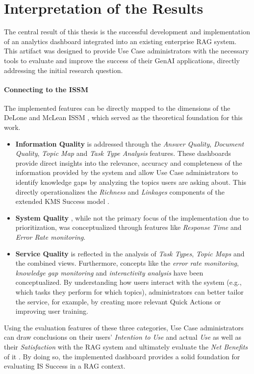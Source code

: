 \documentclass[
	english,
	ruledheaders=section,%
	class=report,%
	thesis={type=bachelor},%
	accentcolor=1b,%
	custommargins=true,%
	marginpar=false,%
	parskip=half-,%
	fontsize=11pt,%
	DIV=14,
]{tudapub}
\begin{document}
\section{Interpretation of the Results}
The central result of this thesis is the successful development and implementation of an analytics dashboard integrated into an existing enterprise RAG system. This artifact was designed to provide Use Case administrators with the necessary tools to evaluate and improve the success of their GenAI applications, directly addressing the initial research question.

\paragraph{Connecting to the ISSM} The implemented features can be directly mapped to the dimensions of the DeLone and McLean ISSM \parencite{DeloneMcLean2003ISSuccessTenYearUpdate}, which served as the theoretical foundation for this work.
\begin{itemize}
    \item \textbf{Information Quality} is addressed through the \textit{Answer Quality}, \textit{Document Quality}, \textit{Topic Map} and \textit{Task Type Analysis} features. These dashboards provide direct insights into the relevance, accuracy and completeness of the information provided by the system and allow Use Case administrators to identify knowledge gaps by analyzing the topics users are asking about. This directly operationalizes the \textit{Richness} and \textit{Linkages} components of the extended KMS Success model \parencite[pp.~57--58]{Jennex2006}.
    \item \textbf{System Quality} \parencite[p.~64]{DeloneMcLean1992ISSuccess}, while not the primary focus of the implementation due to prioritization, was conceptualized through features like \textit{Response Time} and \textit{Error Rate monitoring}.
    \item \textbf{Service Quality} is reflected in the analysis of \textit{Task Types}, \textit{Topic Maps} and the combined views. Furthermore, concepts like the \textit{error rate monitoring}, \textit{knowledge gap monitoring} and \textit{interactivity analysis} have been conceptualized. By understanding how users interact with the system (e.g., which tasks they perform for which topics), administrators can better tailor the service, for example, by creating more relevant Quick Actions or improving user training.
\end{itemize}
Using the evaluation features of these three categories, Use Case administrators can draw conclusions on their users' \textit{Intention to Use} and actual \textit{Use}  as well as their \textit{Satisfaction} with the RAG system and ultimately evaluate the \textit{Net Benefits} of it \parencite[p.~24]{DeloneMcLean2003ISSuccessTenYearUpdate}. By doing so, the implemented dashboard provides a solid foundation for evaluating IS Success in a RAG context.\\
\end{document}
